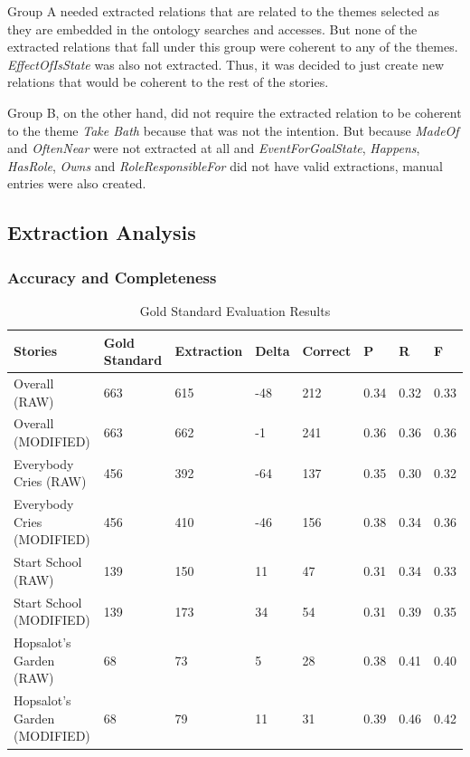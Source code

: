 Group A needed extracted relations that are related to the themes selected as they are embedded in the ontology searches and accesses. But none of the extracted relations that fall under this group were coherent to any of the themes. \textit{EffectOfIsState} was also not extracted. Thus, it was decided to just create new relations that would be coherent to the rest of the stories. 

Group B, on the other hand, did not require the extracted relation to be coherent to the theme \textit{Take Bath} because that was not the intention. But because \textit{MadeOf} and \textit{OftenNear} were not extracted at all and \textit{EventForGoalState}, \textit{Happens}, \textit{HasRole}, \textit{Owns} and \textit{RoleResponsibleFor} did not have valid extractions, manual entries were also created.

\subsection{Extraction Analysis}
\label{sec:extractionanalysis}

\subsubsection{Accuracy and Completeness}

\begin{table}[H]   %
\centering
\caption{Gold Standard Evaluation Results} \vspace{0.25em}
\begin{tabular}{|p{3cm}|p{2cm}|p{2cm}|p{1cm}|p{1.5cm}|p{1cm}|p{1cm}|p{1cm}|} \hline
\textbf{Stories} & \textbf{Gold Standard} & \textbf{Extraction} & \textbf{Delta} & \textbf{Correct} & \textbf{P} & \textbf{R} & \textbf{F} \\ \hline
Overall (RAW) & 663 & 615 & -48 & 212 & 0.34 & 0.32 & 0.33 \\ \hline
Overall (MODIFIED) & 663 & 662 & -1 & 241 & 0.36 & 0.36 & 0.36 \\ \hline
Everybody Cries (RAW) & 456 & 392 & -64 & 137 & 0.35 & 0.30 & 0.32 \\ \hline
Everybody Cries (MODIFIED) & 456 & 410 & -46 & 156 & 0.38 & 0.34 & 0.36 \\ \hline
Start School (RAW) & 139 & 150 & 11 & 47 & 0.31 & 0.34 & 0.33 \\ \hline
Start School (MODIFIED) & 139 & 173 & 34 & 54 & 0.31 & 0.39 & 0.35 \\ \hline
Hopsalot's Garden (RAW) & 68 & 73 & 5 & 28 & 0.38 & 0.41 & 0.40 \\ \hline
Hopsalot's Garden (MODIFIED) & 68 & 79 & 11 & 31 & 0.39 & 0.46 & 0.42 \\ \hline
\end{tabular}
\label{tab:goldsum}
\end{table}

